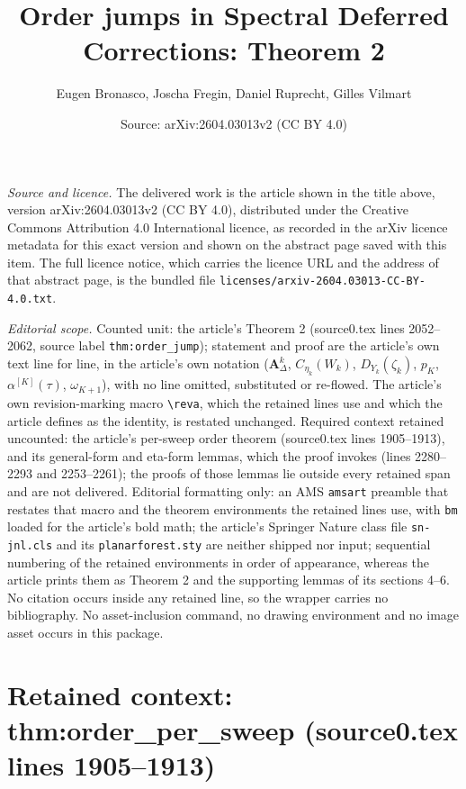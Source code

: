 \documentclass[10pt,a4paper]{amsart}
\title[Order jumps in Spectral Deferred Corrections]{Order jumps in Spectral Deferred Corrections: Theorem 2}
\author{Eugen Bronasco, Joscha Fregin, Daniel Ruprecht, Gilles Vilmart}
\date{Source: arXiv:2604.03013v2 (CC BY 4.0)}
\theoremstyle{plain}
\theoremstyle{definition}
\theoremstyle{remark}
\begin{document}
\maketitle

\noindent\emph{Source and licence.} The delivered work is the article shown in the title above, version arXiv:2604.03013v2 (CC BY 4.0), distributed under the Creative Commons Attribution 4.0 International licence, as recorded in the arXiv licence metadata for this exact version and shown on the abstract page saved with this item. The full licence notice, which carries the licence URL and the address of that abstract page, is the bundled file \texttt{licenses/arxiv-2604.03013-CC-BY-4.0.txt}.\par\smallskip

\noindent\textit{Editorial scope.} Counted unit: the article's Theorem 2 (source0.tex lines 2052--2062, source label \texttt{thm:order\_jump}); statement and proof are the article's own text line for line, in the article's own notation ($\bm{A}^k_\Delta$, $C_{\eta_k}(W_k)$, $D_{Y_k}(\zeta_k)$, $p_K$, $\alpha^{[K]}(\tau)$, $\omega_{K+1}$), with no line omitted, substituted or re-flowed. The article's own revision-marking macro \texttt{\textbackslash reva}, which the retained lines use and which the article defines as the identity, is restated unchanged. Required context retained uncounted: the article's per-sweep order theorem (source0.tex lines 1905--1913), and its general-form and eta-form lemmas, which the proof invokes (lines 2280--2293 and 2253--2261); the proofs of those lemmas lie outside every retained span and are not delivered. Editorial formatting only: an AMS \texttt{amsart} preamble that restates that macro and the theorem environments the retained lines use, with \texttt{bm} loaded for the article's bold math; the article's Springer Nature class file \texttt{sn-jnl.cls} and its \texttt{planarforest.sty} are neither shipped nor input; sequential numbering of the retained environments in order of appearance, whereas the article prints them as Theorem 2 and the supporting lemmas of its sections 4--6. No citation occurs inside any retained line, so the wrapper carries no bibliography. No asset-inclusion command, no drawing environment and no image asset occurs in this package.


\section*{Retained context: thm:order\_per\_sweep (source0.tex lines 1905--1913)}
\end{document}
